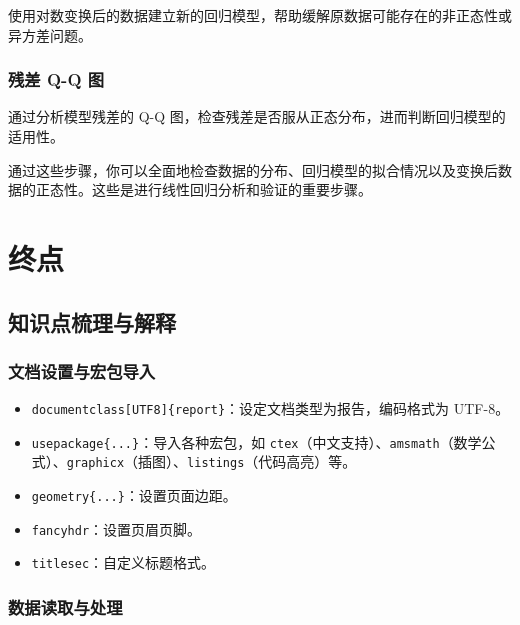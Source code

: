 \documentclass[UTF8]{report}
\theoremstyle{MyLineTheoremStyle} %
\theoremstyle{MyBlockTheoremStyle} %
\theoremstyle{MySubsubsectionStyle} %
\begin{document}
使用对数变换后的数据建立新的回归模型，帮助缓解原数据可能存在的非正态性或异方差问题。

\subsection*{残差 Q-Q 图}

通过分析模型残差的 Q-Q 图，检查残差是否服从正态分布，进而判断回归模型的适用性。

通过这些步骤，你可以全面地检查数据的分布、回归模型的拟合情况以及变换后数据的正态性。这些是进行线性回归分析和验证的重要步骤。



\chapter{终点}

\section*{知识点梳理与解释}

\subsection*{文档设置与宏包导入}

\begin{itemize}
    \item \texttt{documentclass[UTF8]\{report\}}：设定文档类型为报告，编码格式为 UTF-8。
    \item \texttt{usepackage\{...\}}：导入各种宏包，如 \texttt{ctex}（中文支持）、\texttt{amsmath}（数学公式）、\texttt{graphicx}（插图）、\texttt{listings}（代码高亮）等。
    \item \texttt{geometry\{...\}}：设置页面边距。
    \item \texttt{fancyhdr}：设置页眉页脚。
    \item \texttt{titlesec}：自定义标题格式。
\end{itemize}

\subsection*{数据读取与处理}
\end{document}
